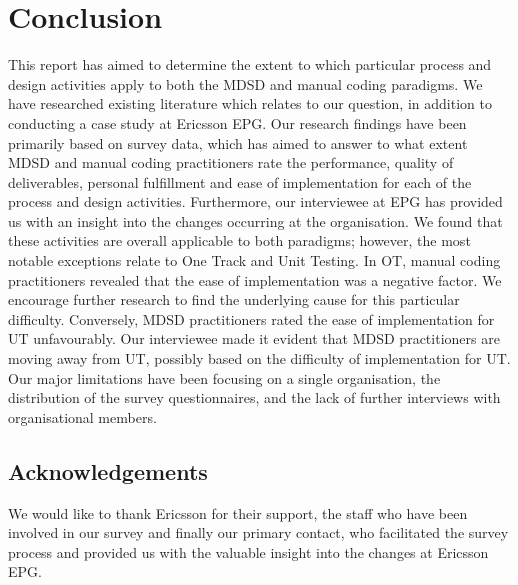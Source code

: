 \documentclass[fina_report_innit.tex]{subfiles}
\begin{document}
\section{Conclusion}
This report has aimed to determine the extent to which particular process and design activities apply to both the MDSD and manual coding paradigms. We have researched existing literature which relates to our question, in addition to conducting a case study at Ericsson EPG. Our research findings have been primarily based on survey data, which has aimed to answer to what extent MDSD and manual coding practitioners rate the performance, quality of deliverables, personal fulfillment and ease of implementation for each of the process and design activities. Furthermore, our interviewee at EPG has provided us with an insight into the changes occurring at the organisation. We found that these activities are overall applicable to both paradigms; however, the most notable exceptions relate to One Track and Unit Testing. In OT, manual coding practitioners revealed that the ease of implementation was a negative factor. We encourage further research to find the underlying cause for this particular difficulty. Conversely, MDSD practitioners rated the ease of implementation for UT unfavourably. Our interviewee made it evident that MDSD practitioners are moving away from UT, possibly based on the difficulty of implementation for UT. Our major limitations have been focusing on a single organisation,  the distribution of the survey questionnaires, and the lack of further interviews with organisational members. 


\subsection*{Acknowledgements}
We would like to thank Ericsson for their support, the staff who have been involved in our survey and finally our primary contact, who facilitated the survey process and provided us with the valuable insight into the changes at Ericsson EPG.
\end{document}
